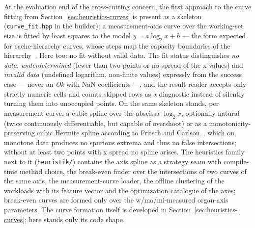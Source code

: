 \begin{nurlang}
At the evaluation end of the cross-cutting concern, the first approach to the curve fitting from
Section~\ref{sec:heuristics-curves} is present as a skeleton (\texttt{curve\_fit.hpp} in the builder):
a measurement-axis curve over the working-set size is fitted by least squares to the model
$y = a\log_2 x + b$ --- the form expected for cache-hierarchy curves, whose steps map the capacity
boundaries of the hierarchy~\cite{hill1989associativity}. Here too: no fit without valid data. The fit
status distinguishes \emph{no data}, \emph{underdetermined} (fewer than two points or no spread of the
x values) and \emph{invalid data} (undefined logarithm, non-finite values) expressly from the success
case --- never an \emph{Ok} with NaN coefficients ---, and the result reader accepts only strictly
numeric cells and counts skipped rows as a diagnostic instead of silently turning them into unoccupied
points. On the same skeleton stands, per measurement curve, a cubic spline over the abscissa
$\log_2 x$, optionally natural (twice continuously differentiable, but capable of overshoot) or as a
monotonicity-preserving cubic Hermite spline according to Fritsch and
Carlson~\cite{fritsch1980monotone}, which on monotone data produces no spurious extrema and thus no
false intersections; without at least two points with x spread no spline arises. The heuristics
family next to it (\texttt{heuristik/}) contains the axis spline as a strategy seam with compile-time
method choice, the break-even finder over the intersections of two curves of the same axis, the
measurement-curve loader, the offline clustering of the workloads with its feature vector and the
optimization catalogue of the axes; break-even curves are formed only over the w/ma/mi-measured
organ-axis parameters. The curve formation itself is developed in
Section~\ref{sec:heuristics-curves}; here stands only its code shape.
\end{nurlang}
